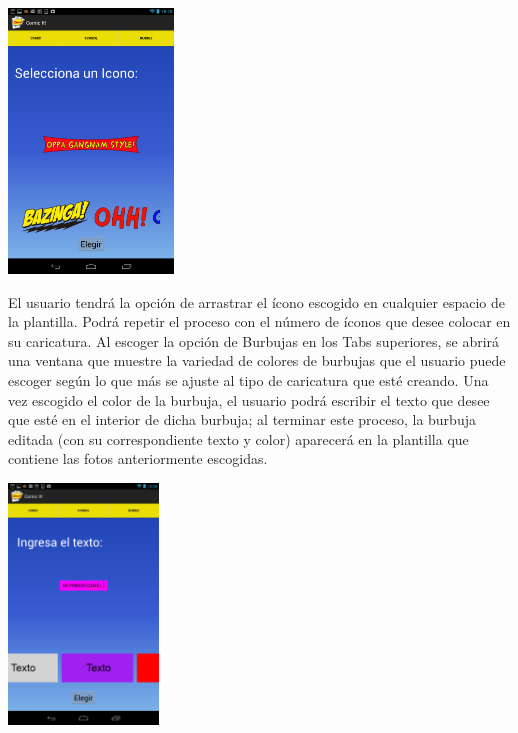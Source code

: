 \documentclass[12pt]{report}
\begin{document}
	\begin{center}
		\begingroup
			\includegraphics[width=0.33\textwidth]{imagenes_usuario/iconos.png}
		\endgroup
	\end{center}


El usuario tendrá la opción de arrastrar el ícono escogido en cualquier espacio de la plantilla. Podrá repetir el proceso con el número de íconos que desee colocar en su caricatura.
Al escoger la opción de Burbujas en los Tabs superiores, se abrirá una ventana que muestre la variedad de colores de burbujas que el usuario puede escoger según lo que más se ajuste al tipo de caricatura que esté creando. Una vez escogido el color de la burbuja, el usuario podrá escribir el texto que desee que esté en el interior de dicha burbuja; al terminar este proceso, la burbuja editada (con su correspondiente texto y color) aparecerá en la plantilla que contiene las fotos anteriormente escogidas.

	\begin{center}
		\begingroup
			\includegraphics[width=0.30\textwidth]{imagenes_usuario/texto.png}
		\endgroup
	\end{center}

\end{document}
